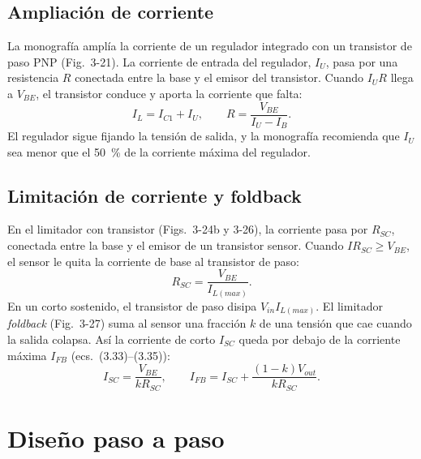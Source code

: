 \documentclass[conference]{IEEEtran}
\begin{document}
\subsection{Ampliación de corriente}
La monografía amplía la corriente de un regulador integrado con un transistor de paso PNP (Fig.~3-21). La corriente de entrada del regulador, $I_U$, pasa por una resistencia $R$ conectada entre la base y el emisor del transistor. Cuando $I_U R$ llega a $V_{BE}$, el transistor conduce y aporta la corriente que falta:
\begin{equation}
I_L=I_{C1}+I_U,\qquad R=\frac{V_{BE}}{I_U-I_B}.
\label{eq:booster}
\end{equation}
El regulador sigue fijando la tensión de salida, y la monografía recomienda que $I_U$ sea menor que el 50~\% de la corriente máxima del regulador.

\subsection{Limitación de corriente y foldback}
En el limitador con transistor (Figs.~3-24b y 3-26), la corriente pasa por $R_{SC}$, conectada entre la base y el emisor de un transistor sensor. Cuando $I R_{SC}\geq V_{BE}$, el sensor le quita la corriente de base al transistor de paso:
\begin{equation}
R_{SC}=\frac{V_{BE}}{I_{L(max)}} .
\label{eq:rsc}
\end{equation}
En un corto sostenido, el transistor de paso disipa $V_{in}I_{L(max)}$. El limitador \emph{foldback} (Fig.~3-27) suma al sensor una fracción $k$ de una tensión que cae cuando la salida colapsa. Así la corriente de corto $I_{SC}$ queda por debajo de la corriente máxima $I_{FB}$ (ecs.~(3.33)--(3.35)):
\begin{equation}
I_{SC}=\frac{V_{BE}}{kR_{SC}},\qquad I_{FB}=I_{SC}+\frac{(1-k)V_{out}}{kR_{SC}} .
\label{eq:fb}
\end{equation}

\section{Diseño paso a paso}
\end{document}
